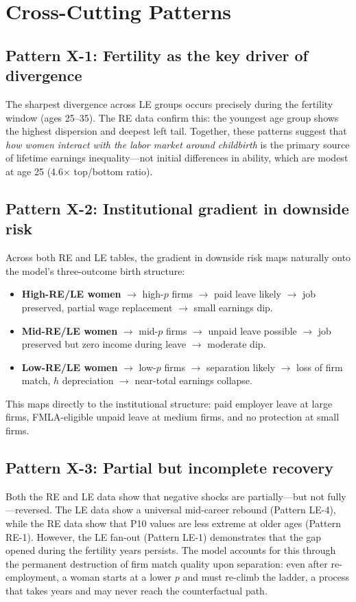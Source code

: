 \documentclass[11pt]{article}
\begin{document}
\section{Cross-Cutting Patterns}

\subsection{Pattern X-1: Fertility as the key driver of divergence}

The sharpest divergence across LE groups occurs precisely during the fertility window (ages 25--35). The RE data confirm this: the youngest age group shows the highest dispersion and deepest left tail. Together, these patterns suggest that \emph{how women interact with the labor market around childbirth} is the primary source of lifetime earnings inequality---not initial differences in ability, which are modest at age 25 (4.6$\times$ top/bottom ratio).

\subsection{Pattern X-2: Institutional gradient in downside risk}

Across both RE and LE tables, the gradient in downside risk maps naturally onto the model's three-outcome birth structure:
\begin{itemize}[nosep]
  \item \textbf{High-RE/LE women} $\to$ high-$p$ firms $\to$ paid leave likely $\to$ job preserved, partial wage replacement $\to$ small earnings dip.
  \item \textbf{Mid-RE/LE women} $\to$ mid-$p$ firms $\to$ unpaid leave possible $\to$ job preserved but zero income during leave $\to$ moderate dip.
  \item \textbf{Low-RE/LE women} $\to$ low-$p$ firms $\to$ separation likely $\to$ loss of firm match, $h$ depreciation $\to$ near-total earnings collapse.
\end{itemize}
This maps directly to the institutional structure: paid employer leave at large firms, FMLA-eligible unpaid leave at medium firms, and no protection at small firms.

\subsection{Pattern X-3: Partial but incomplete recovery}

Both the RE and LE data show that negative shocks are partially---but not fully---reversed. The LE data show a universal mid-career rebound (Pattern LE-4), while the RE data show that P10 values are less extreme at older ages (Pattern RE-1). However, the LE fan-out (Pattern LE-1) demonstrates that the gap opened during the fertility years persists. The model accounts for this through the permanent destruction of firm match quality upon separation: even after re-employment, a woman starts at a lower $p$ and must re-climb the ladder, a process that takes years and may never reach the counterfactual path.
\end{document}
